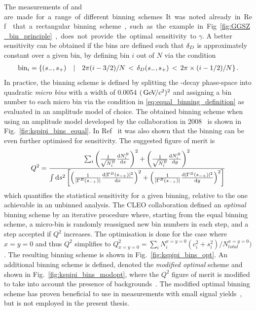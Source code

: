 The measurements of \ci and \si are made for a range of different binning schemes. It was noted already in Ref.~\cite{bondarUseQuantumcorrelatedD02008} that a rectangular binning scheme, such as the example in Fig.~\ref{fig:GGSZ_bin_principle}, does not provide the optimal sensitivity to $\gamma$. A better sensitivity can be obtained if the bins are defined such that $\delta_{D}$ is approximately constant over a given bin, by defining bin $i$ out of $N$ via the condition
\begin{align} \label{eq:equal_binning_definition}
    \text{bin}_i = \left\{ (s_-, s_+)\quad  | \quad 2\pi (i-3/2)/N \,<\, \delta_D(s_-, s_+) \,<\, 2\pi \times (i-1/2)/N  \right\}.
\end{align}
In practice, the binning scheme is defined by splitting the \D-decay phase-space into quadratic \emph{micro bins} with a width of 0.0054 $(\text{\,Ge\kern -0.1em V\!/}c^2)^2$ and assigning a bin number to each micro bin via the condition in \eqref{eq:equal_binning_definition} as evaluated in an amplitude model of choice. The obtained binning scheme when using an amplitude model developed by the \babar collaboration in 2008~\cite{BABAR2008} is shown in Fig.~\ref{fig:kspipi_bins_equal}. In Ref~\cite{bondarUseQuantumcorrelatedD02008} it was also shown that the binning can be even further optimised for sensitivity. The suggested figure of merit is
\begin{align}
    Q^2 = \frac
    {\sum_i \left(\frac{1}{\sqrt{N_i^{{B}}} }\frac{\text d N_i^{{B}}}{\text d x} \right)^2 + \left(\frac{1}{\sqrt{N_i^{{B}}}} \frac{\text d N_i ^{{B}}}{\text d y} \right)^2}
    {\int \text d s^2 \left[\left(\frac{1}{|\Gamma^{{B}}(s_{-+})|}\frac{ \text d |\Gamma^{{B}}(s_{-+})|^2 }{ \text d x}\right)^2 + \left(\frac{1}{|\Gamma^{{B}}(s_{-+})|}\frac{ \text d |\Gamma^{{B}}(s_{-+})|^2 }{ \text d y}\right)^2 \right]}
\end{align}
which quantifies the statistical sensitivity for a given binning, relative to the one achievable in an unbinned analysis. The CLEO collaboration defined an \emph{optimal} binning scheme by an iterative procedure where, starting from the equal binning scheme, a micro-bin is randomly reassigned new bin numbers in each step, and a step accepted if $Q^2$ increases. The optimisation is done for the case where $x=y=0$ and thus $Q^2$ simplifies to $Q^2_{x=y=0}=\sum_i N_i^{x=y=0}(c_i^2+s_i^2)/N_{total}^{x=y=0})$. The resulting binning scheme is shown in Fig.~\ref{fig:kspipi_bins_opt}. An additional binning scheme is defined, denoted the \emph{modified optimal} scheme and shown in Fig.~\ref{fig:kspipi_bins_modopt}, where the $Q^2$ figure of merit is modified to take into account the presence of backgrounds~\cite{CLEOCISI}. The modified optimal binning scheme has proven beneficial to use in measurements with small signal yields~\cite{LHCb-PAPER-2016-006}, but is not employed in the present thesis. 

